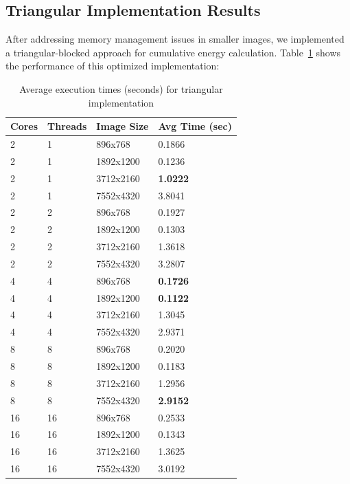 \documentclass[9pt]{IEEEtran}
\begin{document}
\subsection{Triangular Implementation Results}
After addressing memory management issues in smaller images, we implemented a triangular-blocked approach for cumulative energy calculation. Table~\ref{tab:triangular} shows the performance of this optimized implementation:

\begin{table}[h]
    \centering
    \caption{Average execution times (seconds) for triangular implementation}
    \label{tab:triangular}
    \begin{tabular}{|l|l|l|l|}
        \hline
        Cores & Threads & Image Size & Avg Time (sec) \\ \hline
        2 & 1 & 896x768 & 0.1866 \\ \hline
        2 & 1 & 1892x1200 & 0.1236 \\ \hline
        2 & 1 & 3712x2160 & \textbf{1.0222} \\ \hline
        2 & 1 & 7552x4320 & 3.8041 \\ \hline
        \hline
        2 & 2 & 896x768 & 0.1927 \\ \hline
        2 & 2 & 1892x1200 & 0.1303 \\ \hline
        2 & 2 & 3712x2160 & 1.3618 \\ \hline
        2 & 2 & 7552x4320 & 3.2807 \\ \hline
        \hline
        4 & 4 & 896x768 & \textbf{0.1726} \\ \hline
        4 & 4 & 1892x1200 & \textbf{0.1122} \\ \hline
        4 & 4 & 3712x2160 & 1.3045 \\ \hline
        4 & 4 & 7552x4320 & 2.9371 \\ \hline
        \hline
        8 & 8 & 896x768 & 0.2020 \\ \hline
        8 & 8 & 1892x1200 & 0.1183 \\ \hline
        8 & 8 & 3712x2160 & 1.2956 \\ \hline
        8 & 8 & 7552x4320 & \textbf{2.9152} \\ \hline
        \hline
        16 & 16 & 896x768 & 0.2533 \\ \hline
        16 & 16 & 1892x1200 & 0.1343 \\ \hline
        16 & 16 & 3712x2160 & 1.3625 \\ \hline
        16 & 16 & 7552x4320 & 3.0192 \\ \hline
    \end{tabular}
\end{table}
\end{document}
